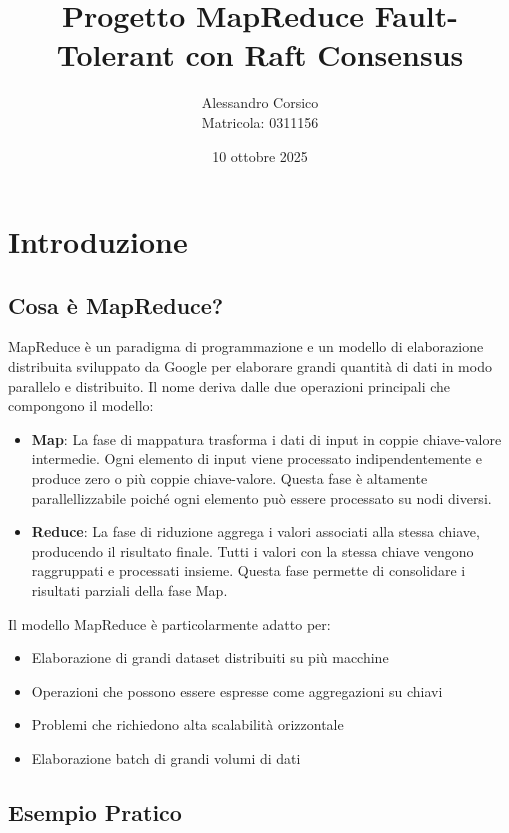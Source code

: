 \documentclass[12pt,a4paper]{article}
\title{\textbf{Progetto MapReduce Fault-Tolerant con Raft Consensus}}
\author{Alessandro Corsico \\ Matricola: 0311156}
\date{10 ottobre 2025}
\begin{document}
\maketitle

\tableofcontents
\newpage

\section{Introduzione}

\subsection{Cosa è MapReduce?}

MapReduce è un paradigma di programmazione e un modello di elaborazione distribuita sviluppato da Google per elaborare grandi quantità di dati in modo parallelo e distribuito. Il nome deriva dalle due operazioni principali che compongono il modello:

\begin{itemize}
\item \textbf{Map}: La fase di mappatura trasforma i dati di input in coppie chiave-valore intermedie. Ogni elemento di input viene processato indipendentemente e produce zero o più coppie chiave-valore. Questa fase è altamente parallellizzabile poiché ogni elemento può essere processato su nodi diversi.

\item \textbf{Reduce}: La fase di riduzione aggrega i valori associati alla stessa chiave, producendo il risultato finale. Tutti i valori con la stessa chiave vengono raggruppati e processati insieme. Questa fase permette di consolidare i risultati parziali della fase Map.
\end{itemize}

Il modello MapReduce è particolarmente adatto per:
\begin{itemize}
\item Elaborazione di grandi dataset distribuiti su più macchine
\item Operazioni che possono essere espresse come aggregazioni su chiavi
\item Problemi che richiedono alta scalabilità orizzontale
\item Elaborazione batch di grandi volumi di dati
\end{itemize}

\subsection{Esempio Pratico}
\end{document}
